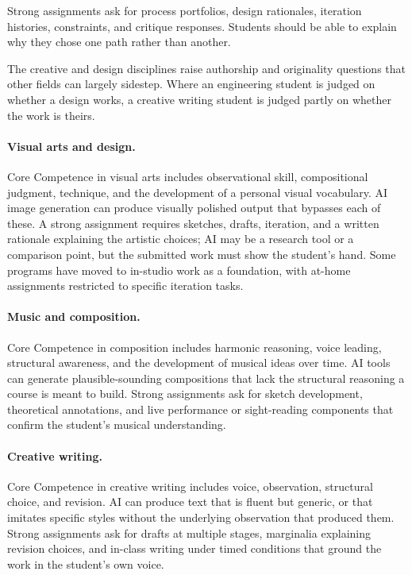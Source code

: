 \documentclass{SIAMbook2023}
\begin{document}
Strong assignments ask for process portfolios, design rationales, iteration histories, constraints, and critique responses. Students should be able to explain why they chose one path rather than another.

The creative and design disciplines raise authorship and originality questions that other fields can largely sidestep. Where an engineering student is judged on whether a design works, a creative writing student is judged partly on whether the work is theirs.

\paragraph{Visual arts and design.} Core Competence in visual arts includes observational skill, compositional judgment, technique, and the development of a personal visual vocabulary. AI image generation can produce visually polished output that bypasses each of these. A strong assignment requires sketches, drafts, iteration, and a written rationale explaining the artistic choices; AI may be a research tool or a comparison point, but the submitted work must show the student's hand. Some programs have moved to in-studio work as a foundation, with at-home assignments restricted to specific iteration tasks.

\paragraph{Music and composition.} Core Competence in composition includes harmonic reasoning, voice leading, structural awareness, and the development of musical ideas over time. AI tools can generate plausible-sounding compositions that lack the structural reasoning a course is meant to build. Strong assignments ask for sketch development, theoretical annotations, and live performance or sight-reading components that confirm the student's musical understanding.

\paragraph{Creative writing.} Core Competence in creative writing includes voice, observation, structural choice, and revision. AI can produce text that is fluent but generic, or that imitates specific styles without the underlying observation that produced them. Strong assignments ask for drafts at multiple stages, marginalia explaining revision choices, and in-class writing under timed conditions that ground the work in the student's own voice.
\end{document}
